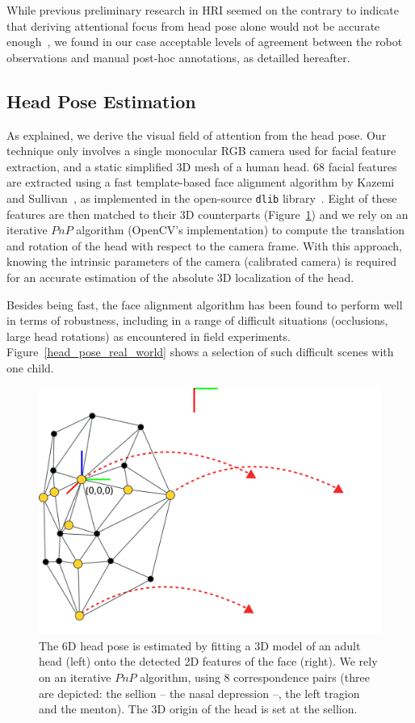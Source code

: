 \documentclass{sig-alternate}
\begin{document}
While previous preliminary research in HRI seemed on the contrary to indicate that deriving
attentional focus from head pose alone would not be accurate
enough~\cite{kennedy2015head}, we found in our case acceptable levels of
agreement between the robot observations and manual post-hoc annotations, as
detailled hereafter.

\subsection{Head Pose Estimation}

As explained, we derive the visual field of attention from the head pose. Our
technique only involves a single monocular RGB camera used for facial
feature extraction, and a static simplified 3D mesh of a human head.
68 facial features are extracted using a fast
template-based face alignment algorithm by Kazemi and
Sullivan~\cite{kazemi2014one}, as implemented in the open-source {\tt dlib}
library~\cite{dlib09}.  Eight of these features are
then matched to their 3D counterparts (Figure~\ref{head_pose}) and we rely on an iterative $PnP$ algorithm
(OpenCV's implementation) to compute the translation and rotation of the head
with respect to the camera frame. With this approach, knowing the intrinsic
parameters of the camera (calibrated camera) is required for an accurate
estimation of the absolute 3D localization of the head.

Besides being fast, the face alignment algorithm has been found to perform well
in terms of robustness, including in a range of difficult situations
(occlusions, large head rotations) as encountered in field experiments.
Figure~\ref{head_pose_real_world} shows a selection of such difficult scenes with
one child.

\begin{figure}[t]
    \centering
    \includegraphics[width=0.9\linewidth]{head_pose}
    \caption{The 6D head pose is estimated by fitting a 3D model of an
        adult head (left) onto the detected 2D features of the face (right). We
        rely on an iterative $PnP$ algorithm, using 8 correspondence pairs
        (three are depicted: the sellion -- the nasal depression --, the left
        tragion and the menton). The 3D origin of the head is set at the sellion.}

    \label{head_pose}
\end{figure}
\end{document}
